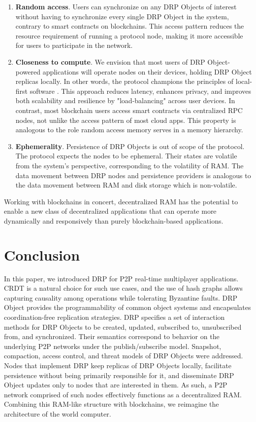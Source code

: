 \documentclass{article}
\begin{document}
\begin{enumerate}
    \item \textbf{Random access}. Users can synchronize on any DRP Objects of interest without having to synchronize every single DRP Object in the system, contrary to smart contracts on blockchains. This access pattern reduces the resource requirement of running a protocol node, making it more accessible for users to participate in the network.
    \item \textbf{Closeness to compute}. We envision that most users of DRP Object-powered applications will operate nodes on their devices, holding DRP Object replicas locally. In other words, the protocol champions the principles of local-first software \cite{LoFi}. This approach reduces latency, enhances privacy, and improves both scalability and resilience by "load-balancing" across user devices. In contrast, most blockchain users access smart contracts via centralized RPC nodes, not unlike the access pattern of most cloud apps. This property is analogous to the role random access memory serves in a memory hierarchy.
    \item \textbf{Ephemerality}. Persistence of DRP Objects is out of scope of the protocol. The protocol expects the nodes to be ephemeral. Their states are volatile from the system's perspective, corresponding to the volatility of RAM. The data movement between DRP nodes and persistence providers is analogous to the data movement between RAM and disk storage which is non-volatile.
\end{enumerate}
\noindent

Working with blockchains in concert, decentralized RAM has the potential to enable a new class of decentralized applications that can operate more dynamically and responsively than purely blockchain-based applications.

\section{Conclusion}

In this paper, we introduced DRP for P2P real-time multiplayer applications. CRDT is a natural choice for such use cases, and the use of hash graphs allows capturing causality among operations while tolerating Byzantine faults. DRP Object provides the programmability of common object systems and encapsulates coordination-free replication strategies. DRP specifies a set of interaction methods for DRP Objects to be created, updated, subscribed to, unsubscribed from, and synchronized. Their semantics correspond to behavior on the underlying P2P networks under the publish/subscribe model. Snapshot, compaction, access control, and threat models of DRP Objects were addressed. Nodes that implement DRP keep replicas of DRP Objects locally, facilitate persistence without being primarily responsible for it, and disseminate DRP Object updates only to nodes that are interested in them. As such, a P2P network comprised of such nodes effectively functions as a decentralized RAM. Combining this RAM-like structure with blockchains, we reimagine the architecture of the world computer.
\end{document}
